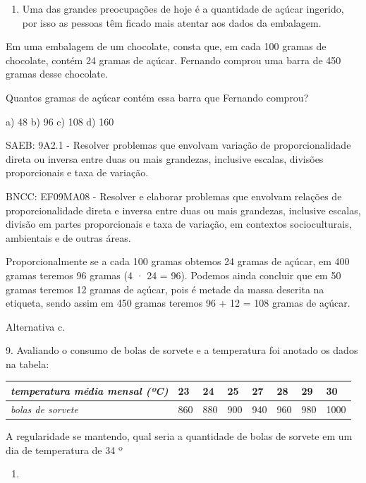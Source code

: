\begin{escolha}
{{{\begin{escolha}
{{{{{\begin{escolha}
\begin{escolha}
{\begin{q°}
\begin{enumerate}
\def\labelenumi{\arabic{enumi}.}
\setcounter{enumi}{7}
\tightlist
\item
  Uma das grandes preocupações de hoje é a quantidade de açúcar
  ingerido, por isso as pessoas têm ficado mais atentar aos dados da
  embalagem.
\end{enumerate}

Em uma embalagem de um chocolate, consta que, em cada 100 gramas de
chocolate, contém 24 gramas de açúcar. Fernando comprou uma barra de 450
gramas desse chocolate.

Quantos gramas de açúcar contém essa barra que Fernando comprou?

a) 48 b) 96 c) 108 d) 160

SAEB: 9A2.1 - Resolver problemas que envolvam variação de
proporcionalidade direta ou inversa entre duas ou mais grandezas,
inclusive escalas, divisões proporcionais e taxa de variação.

BNCC: EF09MA08 - Resolver e elaborar problemas que envolvam relações de
proporcionalidade direta e inversa entre duas ou mais grandezas,
inclusive escalas, divisão em partes proporcionais e taxa de variação,
em contextos socioculturais, ambientais e de outras áreas.

Proporcionalmente se a cada 100 gramas obtemos 24 gramas de açúcar, em
400 gramas teremos 96 gramas (4 · 24 = 96). Podemos ainda concluir que
em 50 gramas teremos 12 gramas de açúcar, pois é metade da massa
descrita na etiqueta, sendo assim em 450 gramas teremos 96 + 12 = 108
gramas de açúcar.

Alternativa c.

9. Avaliando o consumo de bolas de sorvete e a temperatura foi anotado
os dados na tabela:

\begin{longtable}[]{@{}llllllll@{}}
\toprule\noalign{}
\emph{temperatura média mensal (ºC)} & \textbf{23} & \textbf{24} &
\textbf{25} & \textbf{27} & \textbf{28} & \textbf{29} & \textbf{30} \\
\midrule\noalign{}
\endhead
\bottomrule\noalign{}
\endlastfoot
\emph{bolas de sorvete} & 860 & 880 & 900 & 940 & 960 & 980 & 1000 \\
\end{longtable}

A regularidade se mantendo, qual seria a quantidade de bolas de sorvete
em um dia de temperatura de 34 º

\begin{enumerate}
\def\labelenumi{\Alph{enumi}.}
\setcounter{enumi}{2}
\tightlist
\item
\end{enumerate}


\end{q°}}
\end{escolha}
\end{escolha}}}}}}
\end{escolha}}}}
\end{escolha}
